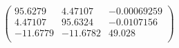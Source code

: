 \documentclass{article}
\begin{document}
\[\left(
\begin{array}{ccc}
 95.6279 & 4.47107 & -0.00069259 \\
 4.47107 & 95.6324 & -0.0107156 \\
 -11.6779 & -11.6782 & 49.028 \\
\end{array}
\right)\]
\end{document}
